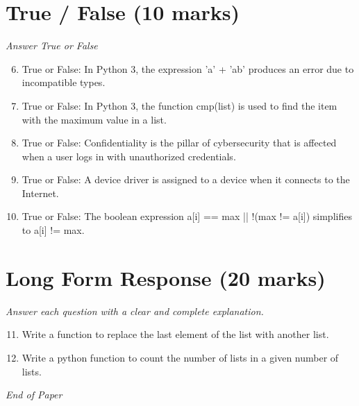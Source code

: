 \documentclass[12pt]{article}
\begin{document}
\section*{True / False (10 marks)}
\textit{Answer True or False}
\begin{enumerate}[label=\arabic*.]
\setcounter{enumi}{5}
\item True or False: In Python 3, the expression 'a' + 'ab' produces an error due to incompatible types.
\item True or False: In Python 3, the function cmp(list) is used to find the item with the maximum value in a list.
\item True or False: Confidentiality is the pillar of cybersecurity that is affected when a user logs in with unauthorized credentials.
\item True or False: A device driver is assigned to a device when it connects to the Internet.
\item True or False: The boolean expression a[i] == max || !(max != a[i]) simplifies to a[i] != max.
\end{enumerate}

\section*{Long Form Response (20 marks)}
\textit{Answer each question with a clear and complete explanation.}
\begin{enumerate}[label=\arabic*.]
\setcounter{enumi}{10}
\item Write a function to replace the last element of the list with another list.
\item Write a python function to count the number of lists in a given number of lists.
\end{enumerate}

\vfill
\noindent\textit{End of Paper}
\end{document}
